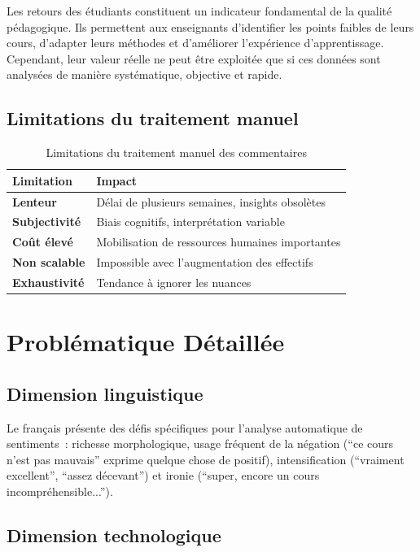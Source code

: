 \documentclass[12pt,a4paper,oneside]{report}
\begin{document}
Les retours des étudiants constituent un indicateur fondamental de la qualité
pédagogique. Ils permettent aux enseignants d'identifier les points faibles
de leurs cours, d'adapter leurs méthodes et d'améliorer l'expérience
d'apprentissage. Cependant, leur valeur réelle ne peut être exploitée que si
ces données sont analysées de manière systématique, objective et rapide.

\subsection{Limitations du traitement manuel}

\begin{table}[H]
\centering
\caption{Limitations du traitement manuel des commentaires}
\label{tab:limites_manuel}
\renewcommand{\arraystretch}{1.4}
\begin{tabular}{>{\bfseries}p{3.2cm} p{9cm}}
\toprule
\rowcolor{bleuprincipal!15}
\textbf{Limitation} & \textbf{Impact} \\
\midrule
Lenteur & Délai de plusieurs semaines, insights obsolètes \\
\rowcolor{gray!8}
Subjectivité & Biais cognitifs, interprétation variable \\
Coût élevé & Mobilisation de ressources humaines importantes \\
\rowcolor{gray!8}
Non scalable & Impossible avec l'augmentation des effectifs \\
Exhaustivité & Tendance à ignorer les nuances \\
\bottomrule
\end{tabular}
\end{table}

\section{Problématique Détaillée}

\subsection{Dimension linguistique}

Le français présente des défis spécifiques pour l'analyse automatique de
sentiments~: richesse morphologique, usage fréquent de la négation (``ce cours
n'est pas mauvais'' exprime quelque chose de positif), intensification
(``vraiment excellent'', ``assez décevant'') et ironie (``super, encore un cours
incompréhensible...'').

\subsection{Dimension technologique}
\end{document}
